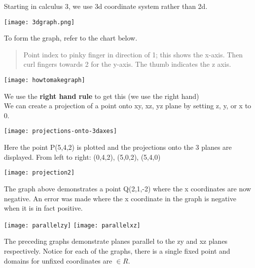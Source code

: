 \documentclass[12pt]{article}
\begin{document}
Starting in calculus 3, we use 3d coordinate system rather than 2d.

\texttt{[image: 3dgraph.png]}

To form the graph, refer to the chart below.
\begin{quote}
	Point index to pinky finger in direction of 1; this shows the x-axis.
Then curl fingers towards 2 for the y-axis. The thumb indicates the z axis.	
\end{quote}

\texttt{[image: howtomakegraph]}

We use the \textbf{right hand rule} to get this (we use the right hand)\\
We can create a projection of a point onto xy, xz, yz plane by setting z, y, or x to 0. 

\texttt{[image: projections-onto-3daxes]}

Here the point P(5,4,2) is plotted and the projections onto the 3 planes are displayed.
From left to right: (0,4,2), (5,0,2), (5,4,0)

\texttt{[image: projection2]}

The graph above demonstrates a point Q(2,1,-2) where the x coordinates are now negative.
An error was made where the x coordinate in the graph is negative when it is in fact positive.

\texttt{[image: parallelzy]}
\texttt{[image: parallelxz]}

The preceding graphs demonstrate planes parallel to the zy and xz planes respectively. 
Notice for each of the graphs, there is a single fixed point and domains for unfixed coordinates are $\in{R}$.
\end{document}
